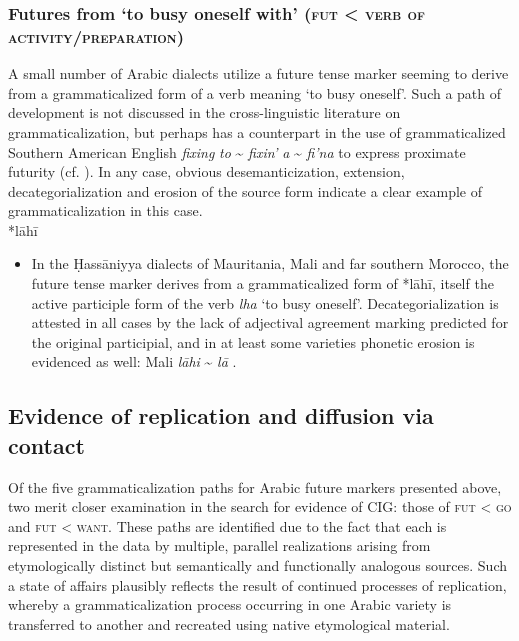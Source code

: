 \documentclass[output=paper]{langsci/langscibook}
\begin{document}
\subsubsection{ Futures from ‘to busy oneself with’ (\textsc{fut} < \textsc{verb} \textsc{of} \textsc{activity/preparation})}

A small number of Arabic dialects utilize a future tense marker seeming to derive from a grammaticalized form of a verb meaning ‘to busy oneself’. Such a path of development is not discussed in the cross-linguistic literature on grammaticalization, but perhaps has a counterpart in the use of grammaticalized Southern American English \textit{fixing} \textit{to} {\textasciitilde} \textit{fixin’} \textit{a} {\textasciitilde} \textit{fi’na} to express proximate futurity (cf. \citealt{Wolfram1998}). In any case, obvious desemanticization, extension, decategorialization and erosion of the source form indicate a clear example of grammaticalization in this case.\\
 
*lāhī

\begin{itemize}

  \item[]
In the Ḥassāniyya dialects of Mauritania, Mali and far southern Morocco, the future tense marker derives from a grammaticalized form of *lāhī, itself the active participle form of the verb \textit{lha} ‘to busy oneself’. Decategorialization is attested in all cases by the lack of adjectival agreement marking predicted for the original participial, and in at least some varieties phonetic erosion is evidenced as well: Mali \textit{lāhi} {\textasciitilde} \textit{lā} \citep{Heath2003}.
\end{itemize}

\subsection{ Evidence of replication and diffusion via contact}\label{sec:repl}


Of the five grammaticalization paths for Arabic future markers presented above, two merit closer examination in the search for evidence of CIG: those of \textsc{fut} < \textsc{go} and \textsc{fut} < \textsc{want}. These paths are identified due to the fact that each is represented in the data by multiple, parallel realizations arising from etymologically distinct but semantically and functionally analogous sources. Such a state of affairs plausibly reflects the result of continued processes of replication, whereby a grammaticalization process occurring in one Arabic variety is transferred to another and recreated using native etymological material.
\end{document}
